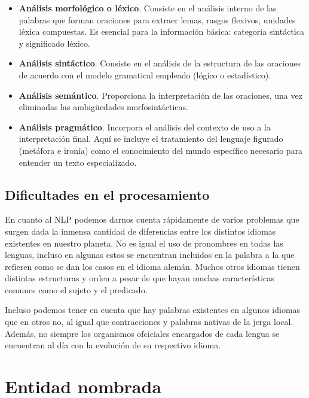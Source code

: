 \documentclass[runningheads]{llncs}
\begin{document}
\begin{itemize}
    \item \textbf{Análisis morfológico o léxico}. Consiste en el análisis interno de las palabras que forman oraciones para extraer lemas, rasgos flexivos, unidades léxica compuestas. Es esencial para la información básica: categoría sintáctica y significado léxico.
    \item \textbf{Análisis sintáctico}. Consiste en el análisis de la estructura de las oraciones de acuerdo con el modelo gramatical empleado (lógico o estadístico).
    \item \textbf{Análisis semántico}. Proporciona la interpretación de las oraciones, una vez eliminadas las ambigüedades morfosintácticas.
    \item \textbf{Análisis pragmático}. Incorpora el análisis del contexto de uso a la interpretación final. Aquí se incluye el tratamiento del lenguaje figurado (metáfora e ironía) como el conocimiento del mundo específico necesario para entender un texto especializado.
\end{itemize}


 
\subsection{Dificultades en el procesamiento}
 
En cuanto al NLP podemos darnos cuenta rápidamente de varios problemas que surgen dada la inmensa cantidad de diferencias entre los distintos idiomas existentes en nuestro planeta. No es igual el uso de pronombres en todas las lenguas, incluso en algunas estos se encuentran incluidos en la palabra a la que refieren como se dan los casos en el idioma alemán. Muchos otros idiomas tienen distintas estructuras y orden a pesar de que hayan muchas características comunes como el sujeto y el predicado.

Incluso podemos tener en cuenta que hay palabras existentes en algunos idiomas que en otros no, al igual que contracciones y palabras nativas de la jerga local. Además, no siempre los organismos ofciciales encargados de cada lengua se encuentran al día con la evolución de su respectivo idioma.


\section{Entidad nombrada}
\end{document}
